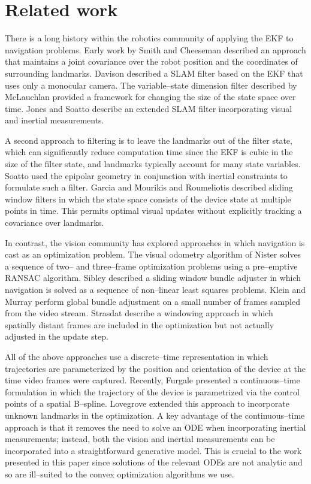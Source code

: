 
\section{Related work}

There is a long history within the robotics community of applying the EKF to navigation problems. Early work by Smith and Cheeseman \cite{smith1986} described an approach that maintains a joint covariance over the robot position and the coordinates of surrounding landmarks. Davison \etal \cite{davison2003} described a SLAM filter based on the EKF that uses only a monocular camera. The variable--state dimension filter described by McLauchlan \cite{mclauchlan1999} provided a framework for changing the size of the state space over time. Jones and Soatto \cite{jones2011} describe an extended SLAM filter incorporating visual and inertial measurements.

A second approach to filtering is to leave the landmarks out of the filter state, which can significantly reduce computation time since the EKF is cubic in the size of the filter state, and landmarks typically account for many state variables. Soatto \etal \cite{soatto1996} used the epipolar geometry in conjunction with inertial constraints to formulate such a filter. Garcia \etal \cite{garcia2002} and Mourikis and Roumeliotis \cite{mourikis2007} described sliding window filters in which the state space consists of the device state at multiple points in time. This permits optimal visual updates without explicitly tracking a covariance over landmarks.

In contrast, the vision community has explored approaches in which navigation is cast as an optimization problem. The visual odometry algorithm of Nister \etal \cite{nister2004} solves a sequence of two-- and three--frame optimization problems using a pre--emptive RANSAC algorithm. Sibley \cite{sibley2006} described a sliding window bundle adjuster in which navigation is solved as a sequence of non--linear least squares problems. Klein and Murray \cite{klein2007} perform global bundle adjustment on a small number of frames sampled from the video stream. Strasdat \etal \cite{strasdat2011} describe a windowing approach in which spatially distant frames are included in the optimization but not actually adjusted in the update step.

All of the above approaches use a discrete--time representation in which trajectories are parameterized by the position and orientation of the device at the time video frames were captured. Recently, Furgale \etal \cite{furgale2012} presented a continuous--time formulation in which the trajectory of the device is parametrized via the control points of a spatial B--spline. Lovegrove \etal extended this approach to incorporate unknown landmarks in the optimization. A key advantage of the continuous--time approach is that it removes the need to solve an ODE when incorporating inertial measurements; instead, both the vision and inertial measurements can be incorporated into a straightforward generative model. This is crucial to the work presented in this paper since solutions of the relevant ODEs are not analytic and so are ill--suited to the convex optimization algorithms we use.

